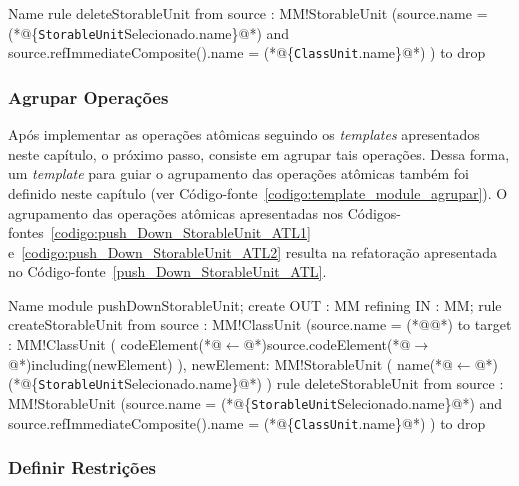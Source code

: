 \begin{codigo}[caption={[ATL representando a operação atômica \texttt{delete}.] ATL representando a operação atômica \texttt{delete}.},escapeinside={(*@}{@*)}, basicstyle=\footnotesize, label={codigo:push_Down_StorableUnit_ATL2}, language=ATL]{Name}
rule deleteStorableUnit {
	from
		source : MM!StorableUnit (source.name = (*@\{\texttt{StorableUnit}Selecionado.name\}@*) and source.refImmediateComposite().name = (*@\{\texttt{ClassUnit}.name\}@*) )
	to
		drop
}
\end{codigo}

\subsubsection{Agrupar Operações}

Após implementar as operações atômicas seguindo os \textit{templates} apresentados neste capítulo, o próximo passo, consiste em agrupar tais operações. Dessa forma, um \textit{template} para guiar o agrupamento das operações atômicas também foi definido neste capítulo (ver Código-fonte~\ref{codigo:template_module_agrupar}). O agrupamento das operações atômicas apresentadas nos Códigos-fontes~\ref{codigo:push_Down_StorableUnit_ATL1} e~\ref{codigo:push_Down_StorableUnit_ATL2} resulta na refatoração apresentada no Código-fonte~\ref{push_Down_StorableUnit_ATL}.

\begin{codigo}[caption={[ATL representando a refatoração \textit{Push Down Attribute}.] ATL da refatoração \textit{Push Down Attribute}.},escapeinside={(*@}{@*)}, basicstyle=\footnotesize, label={codigo:push_Down_StorableUnit_ATL}, language=ATL]{Name}
module pushDownStorableUnit;
create OUT : MM refining IN : MM;
rule createStorableUnit {
	from
		source : MM!ClassUnit (source.name = (*@@*)
	to 
		target : MM!ClassUnit (
			codeElement(*@$\leftarrow$@*)source.codeElement(*@$\rightarrow$@*)including(newElement)
		),
		newElement: MM!StorableUnit (
			name(*@$\leftarrow$@*)(*@\{\texttt{StorableUnit}Selecionado.name\}@*)
		)
}
rule deleteStorableUnit {
	from
		source : MM!StorableUnit (source.name = (*@\{\texttt{StorableUnit}Selecionado.name\}@*) and source.refImmediateComposite().name = (*@\{\texttt{ClassUnit}.name\}@*) )
	to
		drop
}
\end{codigo}

\subsubsection{Definir Restrições}

